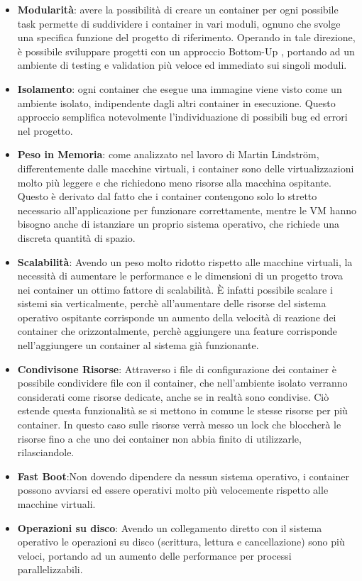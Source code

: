 \begin{itemize}
    \item \textbf{Modularità}: avere la possibilità di creare un container per ogni possibile task permette di suddividere i container in vari moduli, ognuno che svolge una specifica funzione del progetto di riferimento. Operando in tale direzione, è possibile sviluppare progetti con un approccio Bottom-Up
        , portando ad un ambiente di testing e validation più veloce ed immediato sui singoli moduli.
    \item \textbf{Isolamento}: ogni container che esegue una immagine viene visto come un ambiente isolato, indipendente dagli altri container in esecuzione. Questo approccio semplifica notevolmente l'individuazione di possibili bug ed errori nel progetto.
    \item \textbf{Peso in Memoria}: come analizzato nel lavoro di Martin Lindström\cite{performance-container}, differentemente dalle macchine virtuali, i container sono delle virtualizzazioni molto più leggere e che richiedono meno risorse alla macchina ospitante. Questo è derivato dal fatto che i container contengono solo lo stretto necessario all'applicazione per funzionare correttamente,
        mentre le VM hanno bisogno anche di istanziare un proprio sistema operativo, che richiede una discreta quantità di spazio.
    \item \textbf{Scalabilità}: Avendo un peso molto ridotto rispetto alle macchine virtuali, la necessità di aumentare le performance e le dimensioni di un progetto trova nei container un ottimo fattore di scalabilità. È  infatti possibile scalare i sistemi sia verticalmente, perchè all'aumentare delle risorse del sistema operativo ospitante corrisponde un aumento della velocità di reazione dei container
    che orizzontalmente, perchè aggiungere una feature corrisponde nell'aggiungere un container al sistema già funzionante. 
    \item \textbf{Condivisone Risorse}: Attraverso i file di configurazione dei container è possibile condividere file con il container, che nell'ambiente isolato verranno considerati come risorse dedicate, anche se in realtà sono condivise. Ciò estende questa funzionalità se si mettono in comune le stesse risorse per più container. In questo caso sulle risorse verrà messo un lock che bloccherà le risorse fino a che
        uno dei container non abbia finito di utilizzarle, rilasciandole.
    \item \textbf{Fast Boot}:Non dovendo dipendere da nessun sistema operativo, i container possono avviarsi ed essere operativi molto più velocemente rispetto alle macchine virtuali.
    \item \textbf{Operazioni su disco}: Avendo un collegamento diretto con il sistema operativo le operazioni su  disco (scrittura, lettura e cancellazione) sono più veloci, portando ad un aumento delle performance per processi parallelizzabili.
\end{itemize}

